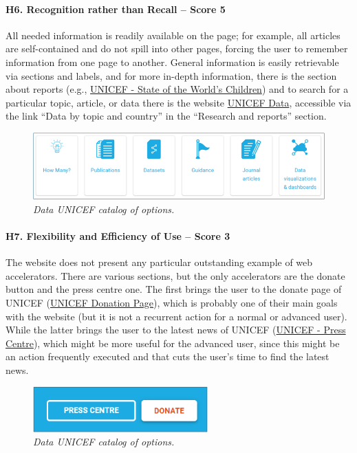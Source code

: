 \paragraph*{H6. Recognition rather than Recall – Score 5}
All needed information is readily available on the page; for example, all articles are self-contained and do not spill into other pages, forcing the user to remember information from one page to another. General information is easily retrievable via sections and labels, and for more in-depth information, there is the section about reports (e.g., \href{https://www.unicef.org/reports/state-of-worlds-children}{UNICEF - State of the World's Children}) and to search for a particular topic, article, or data there is the website \href{https://data.unicef.org/}{UNICEF Data}, accessible via the link “Data by topic and country” in the “Research and reports” section.
\begin{figure}[h]
	\includegraphics[width=\textwidth]{Picture10.png}
	\captionsetup{font=small}
	\caption{\textit{Data UNICEF catalog of options.}}
	\label{fig:label10}
\end{figure}

\paragraph*{H7. Flexibility and Efficiency of Use – Score 3}
The website does not present any particular outstanding example of web accelerators. There are various sections, but the only accelerators are the donate button and the press centre one. The first brings the user to the donate page of UNICEF (\href{https://donazioni.unicef.it/}{UNICEF Donation Page}), which is probably one of their main goals with the website (but it is not a recurrent action for a normal or advanced user). While the latter brings the user to the latest news of UNICEF (\href{https://www.unicef.org/media/press-centre}{UNICEF - Press Centre}), which might be more useful for the advanced user, since this might be an action frequently executed and that cuts the user’s time to find the latest news.
\begin{figure}[h]
	\centering
	\begin{center}
		\includegraphics[width=0.6\textwidth]{Picture11.png}
	\end{center}
	\captionsetup{font=small}
	\caption{\textit{Data UNICEF catalog of options.}}
	\label{fig:label11}
\end{figure}

